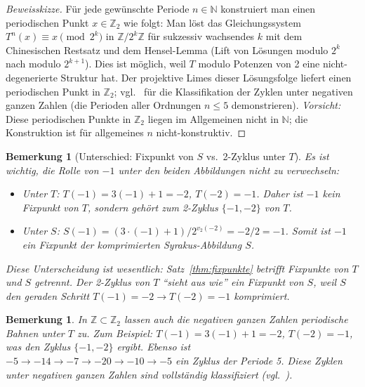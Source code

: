 \documentclass[12pt,a4paper]{article}
\newtheorem{remark}[theorem]{Bemerkung}
\begin{document}
\begin{proof}[Beweisskizze]
Für jede gewünschte Periode $n \in \mathbb{N}$ konstruiert man einen periodischen Punkt
$x \in \mathbb{Z}_2$ wie folgt: Man löst das Gleichungssystem $T^n(x) \equiv x \pmod{2^k}$
in $\mathbb{Z}/2^k\mathbb{Z}$ für sukzessiv wachsendes $k$ mit dem Chinesischen
Restsatz und dem Hensel-Lemma (Lift von Lösungen modulo $2^k$ nach modulo $2^{k+1}$).
Dies ist möglich, weil $T$ modulo Potenzen von 2 eine nicht-degenerierte Struktur hat.
Der projektive Limes dieser Lösungsfolge liefert einen periodischen Punkt in
$\mathbb{Z}_2$; vgl.\ \cite{Lagarias1985} für die Klassifikation der Zyklen unter
negativen ganzen Zahlen (die Perioden aller Ordnungen $n \leq 5$ demonstrieren).
\emph{Vorsicht:} Diese periodischen Punkte in $\mathbb{Z}_2$ liegen im Allgemeinen
nicht in $\mathbb{N}$; die Konstruktion ist für allgemeines $n$ nicht-konstruktiv.
\end{proof}

\begin{remark}[Unterschied: Fixpunkt von $S$ vs.\ 2-Zyklus unter $T$]\label{rem:T_vs_S}
Es ist wichtig, die Rolle von $-1$ unter den beiden Abbildungen nicht zu verwechseln:
\begin{itemize}
  \item Unter $T$: $T(-1) = 3(-1)+1 = -2$, $T(-2) = -1$. Daher ist $-1$ \emph{kein}
    Fixpunkt von $T$, sondern gehört zum 2-Zyklus $\{-1,-2\}$ von $T$.
  \item Unter $S$: $S(-1) = (3\cdot(-1)+1)/2^{v_2(-2)} = -2/2 = -1$. Somit ist $-1$
    ein \emph{Fixpunkt der komprimierten Syrakus-Abbildung $S$}.
\end{itemize}
Diese Unterscheidung ist wesentlich: Satz~\ref{thm:fixpunkte} betrifft Fixpunkte von $T$
und $S$ getrennt. Der 2-Zyklus von $T$ ``sieht aus wie'' ein Fixpunkt von $S$, weil $S$
den geraden Schritt $T(-1)=-2 \to T(-2)=-1$ komprimiert.
\end{remark}

\begin{remark}\label{rem:negativ}
In $\mathbb{Z} \subset \mathbb{Z}_2$ lassen auch die negativen ganzen Zahlen periodische
Bahnen unter $T$ zu. Zum Beispiel: $T(-1) = 3(-1)+1 = -2$, $T(-2) = -1$, was den
Zyklus $\{-1, -2\}$ ergibt. Ebenso ist $-5 \to -14 \to -7 \to -20 \to -10 \to -5$ ein
Zyklus der Periode 5. Diese Zyklen unter negativen ganzen Zahlen sind vollständig
klassifiziert (vgl.\ \cite{Lagarias1985}).
\end{remark}
\end{document}
